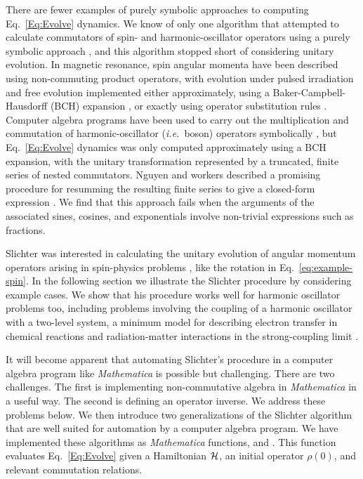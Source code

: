 There are fewer examples of purely symbolic approaches to computing Eq.~\ref{Eq:Evolve} dynamics.
We know of only one algorithm that attempted to calculate commutators of spin- and harmonic-oscillator operators using a purely symbolic approach \cite{Zitko2011oct}, and this algorithm stopped short of considering unitary evolution.
In magnetic resonance, spin angular momenta have been described using non-commuting product operators, with evolution under pulsed irradiation and free evolution implemented either approximately, using a Baker-Campbell-Hausdorff (BCH) expansion \cite{Filip2010nov}, or exactly using operator substitution rules \cite{Shriver1991oct,Kanters1993jan,Guntert1993jan,Guntert2006aug}.
Computer algebra programs have been used to carry out the multiplication and commutation of harmonic-oscillator (\emph{i.e.}\ boson) operators symbolically \cite{Beskrovnyi1998jun,Nguyen1998dec,Zitko2011oct}, but Eq.~\ref{Eq:Evolve} dynamics was only computed approximately using a BCH expansion, with the unitary transformation represented by a truncated, finite series of nested commutators.
Nguyen and workers described a promising procedure for resumming the resulting finite series to give a closed-form expression \cite{Nguyen1998dec}.
We find that this approach fails when the arguments of the associated sines, cosines, and exponentials involve non-trivial expressions such as fractions.

Slichter was interested in calculating the unitary evolution of angular momentum operators arising in spin-physics problems \cite{Slichter1990}, like the rotation in Eq.~\ref{eq:example-spin}.
In the following section we illustrate the Slichter procedure by considering example cases.
We show that his procedure works well for harmonic oscillator problems too, including problems involving the coupling of a harmonic oscillator with a two-level system, a minimum model for describing electron transfer in chemical reactions \cite{Mikkelsen1987feb} and radiation-matter interactions in the strong-coupling limit \cite{Jaynes1963jan,Eberly1980may,Greentree2013nov,Larson2024aug}.

It will become apparent that automating Slichter's procedure in a computer algebra program like \emph{Mathematica} is possible but challenging.
There are two challenges.
The first is implementing non-commutative algebra in \emph{Mathematica} in a useful way. 
The second is defining an operator inverse.
We address these problems below.
We then introduce two generalizations of the Slichter algorithm that are well suited for automation by a computer algebra program.
We have implemented these algorithms as \emph{Mathematica} functions,  and .
This function evaluates Eq.~\ref{Eq:Evolve} given a Hamiltonian ${\cal H}$, an initial operator $\rho(0)$, and relevant commutation relations.